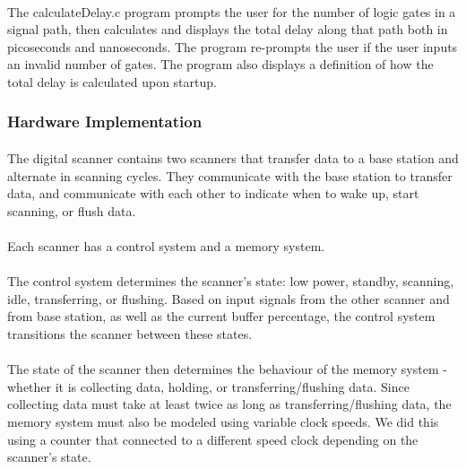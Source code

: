 \documentclass{article}
\begin{document}
  \paragraph{} The calculateDelay.c program prompts the user for the number of logic gates in a signal path, then calculates and displays the total delay along that path both in picoseconds and nanoseconds. The program re-prompts the user if the user inputs an invalid number of gates. The program also displays a definition of how the total delay is calculated upon startup.


  \subsubsection{Hardware Implementation}
  \paragraph{} The digital scanner contains two scanners that transfer data to a base station and alternate in scanning cycles. They communicate with the base station to transfer data, and communicate with each other to indicate when to wake up, start scanning, or flush data.

  \paragraph{} Each scanner has a control system and a memory system.

  \paragraph{} The control system determines the scanner’s state: low power, standby, scanning, idle, transferring, or flushing. Based on input signals from the other scanner and from base station, as well as the current buffer percentage, the control system transitions the scanner between these states.

  \paragraph{} The state of the scanner then determines the behaviour of the memory system - whether it is collecting data, holding, or transferring/flushing data. Since collecting data must take at least twice as long as transferring/flushing data, the memory system must also be modeled using variable clock speeds. We did this using a counter that connected to a different speed clock depending on the scanner’s state.
\end{document}
